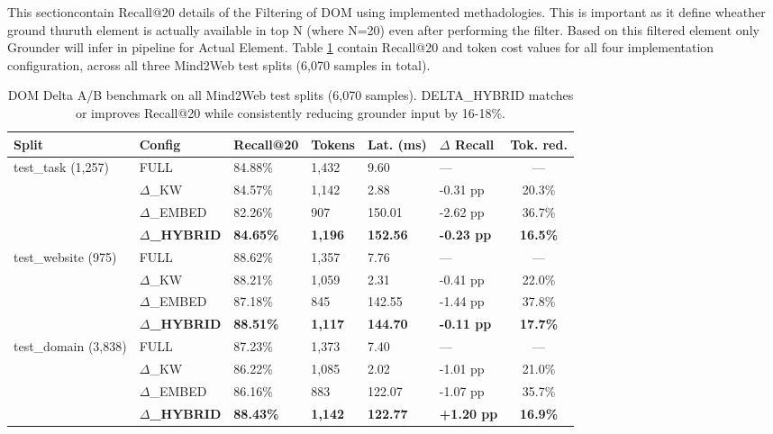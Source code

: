 This sectioncontain Recall@20 details of the Filtering of DOM using implemented methadologies. This is important as it define wheather ground thuruth element is actually available in top N (where N=20) even after performing the filter. Based on this filtered element only Grounder will infer in pipeline for Actual Element. Table \ref{tab:recall} contain Recall@20 and token cost values for all four implementation configuration, across all three Mind2Web test splits (6{,}070 samples in total).

\begin{table}[!t]
\footnotesize
\centering
\begin{tabularx}{\textwidth}{X|X|X|X|X|X|c}
\hline
\textbf{Split} & \textbf{Config} & \textbf{Recall@20} & \textbf{Tokens} & \textbf{Lat. (ms)} & \textbf{$\Delta$ Recall} & \textbf{Tok. red.} \\
\hline
test\_task (1{,}257)     & FULL & 84.88\% & 1{,}432 & 9.60 & --- & --- \\
                         & $\Delta$\_KW & 84.57\% & 1{,}142 & 2.88 & -0.31 pp & 20.3\% \\
                         & $\Delta$\_EMBED & 82.26\% & 907 & 150.01 & -2.62 pp & 36.7\% \\
                         & \textbf{$\Delta$\_HYBRID} & \textbf{84.65\%} & \textbf{1{,}196} & \textbf{152.56} & \textbf{-0.23 pp} & \textbf{16.5\%} \\
\hline
test\_website (975)      & FULL & 88.62\% & 1{,}357 & 7.76 & --- & --- \\
                         & $\Delta$\_KW & 88.21\% & 1{,}059 & 2.31 & -0.41 pp & 22.0\% \\
                         & $\Delta$\_EMBED & 87.18\% & 845 & 142.55 & -1.44 pp & 37.8\% \\
                         & \textbf{$\Delta$\_HYBRID} & \textbf{88.51\%} & \textbf{1{,}117} & \textbf{144.70} & \textbf{-0.11 pp} & \textbf{17.7\%} \\
\hline
test\_domain (3{,}838)   & FULL & 87.23\% & 1{,}373 & 7.40 & --- & --- \\
                         & $\Delta$\_KW & 86.22\% & 1{,}085 & 2.02 & -1.01 pp & 21.0\% \\
                         & $\Delta$\_EMBED & 86.16\% & 883 & 122.07 & -1.07 pp & 35.7\% \\
                         & \textbf{$\Delta$\_HYBRID} & \textbf{88.43\%} & \textbf{1{,}142} & \textbf{122.77} & \textbf{+1.20 pp} & \textbf{16.9\%} \\
\hline
\end{tabularx}
\caption{DOM Delta A/B benchmark on all Mind2Web test splits (6{,}070 samples). DELTA\_HYBRID matches or improves Recall@20 while consistently reducing grounder input by 16-18\%.}
\label{tab:recall}
\end{table}

